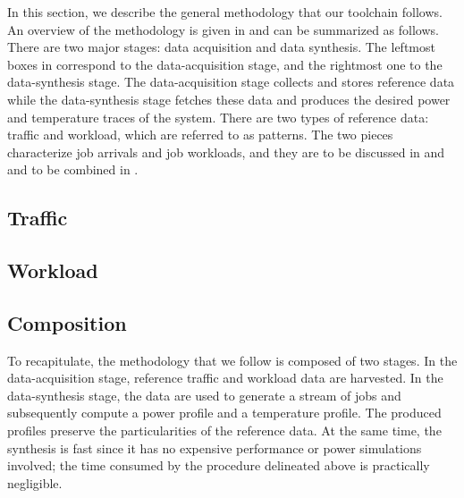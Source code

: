 In this section, we describe the general methodology that our toolchain follows.
An overview of the methodology is given in  and can be
summarized as follows. There are two major stages: data acquisition and data
synthesis. The leftmost boxes in  correspond to the
data-acquisition stage, and the rightmost one to the data-synthesis stage. The
data-acquisition stage collects and stores reference data while the
data-synthesis stage fetches these data and produces the desired power and
temperature traces of the system. There are two types of reference data: traffic
and workload, which are referred to as patterns. The two pieces characterize job
arrivals and job workloads, and they are to be discussed in  and
 and to be combined in .

\subsection{Traffic} 


\subsection{Workload} 


\subsection{Composition} 


To recapitulate, the methodology that we follow is composed of two stages. In
the data-acquisition stage, reference traffic and workload data are harvested.
In the data-synthesis stage, the data are used to generate a stream of jobs and
subsequently compute a power profile and a temperature profile. The produced
profiles preserve the particularities of the reference data. At the same time,
the synthesis is fast since it has no expensive performance or power simulations
involved; the time consumed by the procedure delineated above is practically
negligible.
